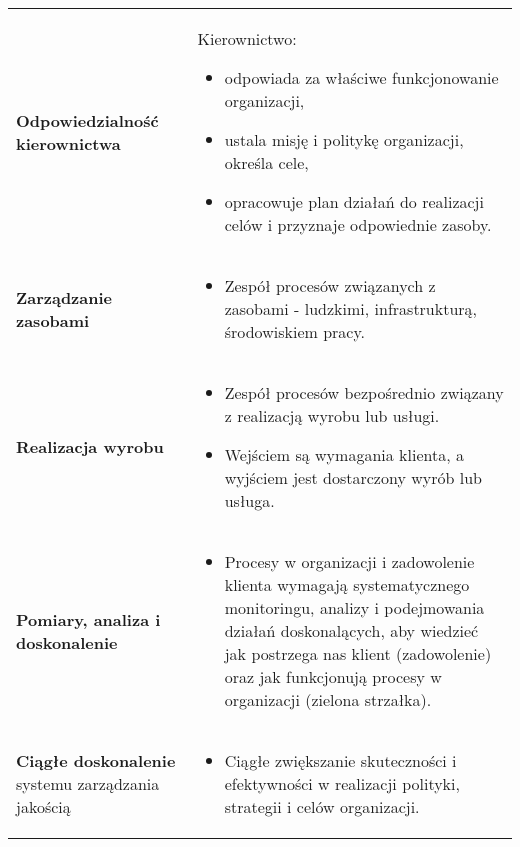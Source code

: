 \documentclass[../main.tex]{subfiles}
\begin{document}
    \begin{table}[H]
        \begin{center}
            \begin{tabular}{ p{8cm} p{8cm} }
                \textbf{Odpowiedzialność kierownictwa}
                &
                Kierownictwo:
                \begin{itemize}
                    \item odpowiada za właściwe funkcjonowanie organizacji,
                    \item ustala misję i politykę organizacji, określa cele,
                    \item opracowuje plan
                    działań do realizacji celów i przyznaje odpowiednie zasoby.
                \end{itemize}
                \\

                \textbf{Zarządzanie zasobami}
                &
                \begin{itemize}
                    \item Zespół procesów związanych z zasobami - ludzkimi, infrastrukturą, środowiskiem pracy.
                \end{itemize}
                \\

                \textbf{Realizacja wyrobu}
                &
                \begin{itemize}
                    \item Zespół procesów bezpośrednio związany z
                    realizacją wyrobu lub usługi.
                    \item Wejściem są wymagania klienta, a wyjściem jest
                    dostarczony wyrób lub usługa.
                \end{itemize}
                \\

                \textbf{Pomiary, analiza i doskonalenie}
                &
                \begin{itemize}
                    \item Procesy w organizacji i zadowolenie klienta
                    wymagają systematycznego monitoringu, analizy i
                    podejmowania działań doskonalących, aby wiedzieć
                    jak postrzega nas klient (zadowolenie) oraz jak
                    funkcjonują procesy w organizacji (zielona strzałka).
                \end{itemize}
                \\

                \textbf{Ciągłe doskonalenie} systemu zarządzania jakością
                &
                \begin{itemize}
                    \item Ciągłe zwiększanie skuteczności i efektywności w realizacji polityki,
                    strategii i celów organizacji.
                \end{itemize}
                \\
            \end{tabular}
        \end{center}
    \end{table}
\end{document}
